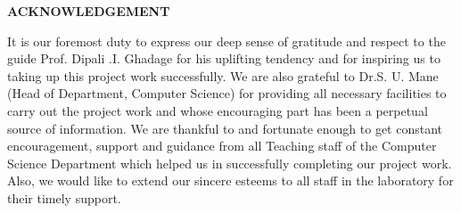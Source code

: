  \setcounter{page}{4}
\begin{center}
{\large{\bf{ACKNOWLEDGEMENT}}}
\end{center}
\vspace{1cm}


\noindent It is our foremost duty to express our deep sense of gratitude and respect to the guide Prof. Dipali .I. Ghadage  for his uplifting tendency and for inspiring us to taking up this project work successfully. We are also grateful to Dr.S. U. Mane (Head of Department, Computer Science) for providing all necessary facilities to carry out the project work and whose encouraging part has been a perpetual source of information. We are thankful to and fortunate enough to get constant encouragement, support and guidance from all Teaching staff of the Computer Science Department which helped us in successfully completing our project work. Also, we would like to extend our sincere esteems to all staff in the laboratory for their timely support.\\

\clearpage